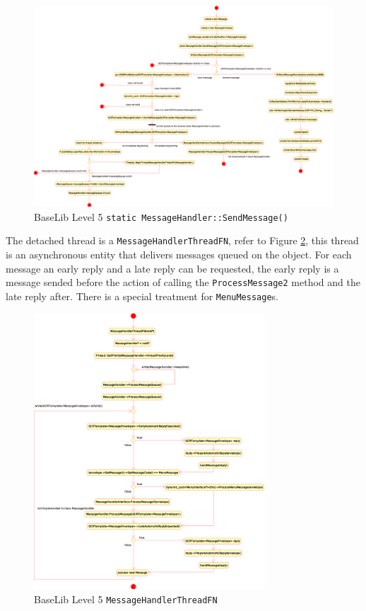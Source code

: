 \begin{figure}
 \centering
 \includegraphics[width=\textwidth]{level5/MSG-dispatching.eps}
 \caption{BaseLib Level 5 \texttt{static MessageHandler::SendMessage()}}
 \label{f:level5:MSG-dispatch}
\end{figure}
\clearpage



The detached thread is a \texttt{MessageHandlerThreadFN}, refer to Figure \ref{f:level5:MSG-ThreadFN}, this thread is an asynchronous entity that delivers messages queued on the object. For each message an early reply and a late reply can be requested, the early reply is a message sended before the action of calling the \texttt{ProcessMessage2} method and the late reply after. There is a special treatment for \texttt{MenuMessage}s.

\begin{figure}[h!]
 \begin{center}
  \includegraphics[width=0.77\textwidth]{level5/MSG-ThreadFN.eps} 
  \caption{BaseLib Level 5 \texttt{MessageHandlerThreadFN}}
  \label{f:level5:MSG-ThreadFN}
 \end{center}
\end{figure}



